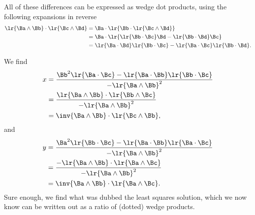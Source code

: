 {All of these differences can be expressed as wedge dot products, using the following expansions in reverse
\begin{equation}\label{eqn:solutionOfLinearSystem:1680}
\begin{aligned}
\lr{ \Ba \wedge \Bb } \cdot \lr{ \Bc \wedge \Bd }
&=
\Ba \cdot \lr{ \Bb \cdot \lr{ \Bc \wedge \Bd } } \\
&=
\Ba \cdot \lr{ \lr{\Bb \cdot \Bc} \Bd - \lr{\Bb \cdot \Bd} \Bc } \\
&=
\lr{ \Ba \cdot \Bd } \lr{\Bb \cdot \Bc} - \lr{ \Ba \cdot \Bc }\lr{\Bb \cdot \Bd}.
\end{aligned}
\end{equation}

We find
\begin{equation}\label{eqn:solutionOfLinearSystem:1700}
\begin{aligned}
x
&= \frac{\Bb^2 \lr{ \Ba \cdot \Bc } - \lr{ \Ba \cdot \Bb} \lr{ \Bb \cdot \Bc }}{-\lr{ \Ba \wedge \Bb }^2 } \\
&= \frac{\lr{ \Ba \wedge \Bb } \cdot \lr{ \Bb \wedge \Bc }}{ -\lr{ \Ba \wedge \Bb }^2 } \\
&= \inv{ \Ba \wedge \Bb } \cdot \lr{ \Bc \wedge \Bb },
\end{aligned}
\end{equation}
and
\begin{equation}\label{eqn:solutionOfLinearSystem:1720}
\begin{aligned}
y
&= \frac{\Ba^2 \lr{ \Bb \cdot \Bc } - \lr{ \Ba \cdot \Bb} \lr{ \Ba \cdot \Bc } }{-\lr{ \Ba \wedge \Bb }^2 } \\
&= \frac{- \lr{ \Ba \wedge \Bb } \cdot \lr{ \Ba \wedge \Bc } }{ -\lr{ \Ba \wedge \Bb }^2 } \\
&= \inv{ \Ba \wedge \Bb } \cdot \lr{ \Ba \wedge \Bc }.
\end{aligned}
\end{equation}
Sure enough, we find what was dubbed the least squares solution, which we now know can be written out as a ratio of (dotted) wedge products.
} %
